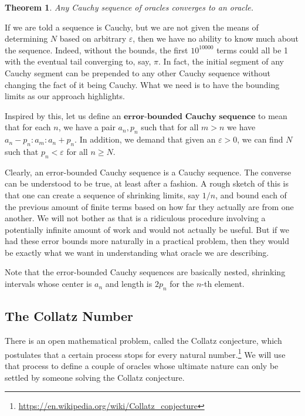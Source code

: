 \documentclass[12pt]{article}
\newtheorem{theorem}{Theorem}
\theoremstyle{remark}
\begin{document}
\begin{theorem}\label{th:cauchy}
Any Cauchy sequence of oracles converges to an oracle. 
\end{theorem}

If we are told a sequence is Cauchy, but we are not given the means of determining $N$ based on arbitrary $\varepsilon$, then we have no ability to know much about the sequence. Indeed, without the bounds, the first $10^{10000}$ terms could all be 1 with the eventual tail converging to, say, $\pi$.  In fact, the initial segment of any Cauchy segment can be prepended to any other Cauchy sequence without changing the fact of it being Cauchy. What we need is to have the bounding limits as our approach highlights. 

Inspired by this, let us define an $\textbf{error-bounded Cauchy sequence}$ to mean that for each $n$, we have a pair $a_n, p_n$ such that for all $m>n$ we have $a_n-p_n : a_m : a_n+p_n$. In addition, we demand that given an $\varepsilon>0$, we can find $N$ such that $p_n < \varepsilon$ for all $n \geq N$. 

Clearly, an error-bounded Cauchy sequence is a Cauchy sequence. The converse can be understood to be true, at least after a fashion. A rough sketch of this is that one can create a sequence of shrinking limits, say $1/n$, and bound each of the previous amount of finite terms based on how far they actually are from one another. We will not bother as that is a ridiculous procedure involving a potentially infinite amount of work and would not actually be useful. But if we had these error bounds more naturally in a practical problem, then they would be exactly what we want in understanding what oracle we are describing.    

Note that the error-bounded Cauchy sequences are basically nested, shrinking intervals whose center is $a_n$ and length is $2p_n$ for the $n$-th element. 


\subsection{The Collatz Number}

There is an open mathematical problem, called the Collatz conjecture, which postulates that a certain process stops for every natural number.\footnote{\url{https://en.wikipedia.org/wiki/Collatz_conjecture}} We will use that process to define a couple of oracles whose ultimate nature can only be settled by someone solving the Collatz conjecture. 
\end{document}
